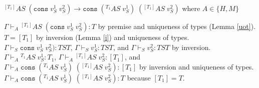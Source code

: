 \begin{case}
$^{[T_{1}]}AS\;(\mathtt{cons}\;v_{S}^{1}\;v_{S}^{2})\rightarrow\mathtt{cons}\;(^{T_{1}}AS\;v_{S}^{1})\;(^{[T_{1}]}AS\;v_{S}^{2})$ where $A\in\lbrace H,M\rbrace$

$\Gamma\vdash_{A}{^{[T_{1}]}A}S\;(\mathtt{cons}\;v_{S}^{1}\;v_{S}^{2}):T$ by premise and uniqueness of types (Lemma \ref{uot}).  $T=[T_{1}]$ by inversion (Lemma \ref{i}) and uniqueness of types.  $\Gamma\vdash_{S}\mathtt{cons}\;v_{S}^{1}\;v_{S}^{2}):TST$, $\Gamma\vdash_{S}v_{S}^{1}:TST$, and $\Gamma\vdash_{S}v_{S}^{2}:TST$ by inversion.  $\Gamma\vdash_{A}{^{T_{1}}A}S\;v_{S}^{1}:T_{1}$, $\Gamma\vdash_{A}{^{[T_{1}]}A}S\;v_{S}^{2}:[T_{1}]$, and $\Gamma\vdash_{A}\mathtt{cons}\;(^{T_{1}}AS\;v_{S}^{1})\;(^{[T_{1}]}AS\;v_{S}^{2}):[T_{1}]$ by inversion and uniqueness of types.  $\Gamma\vdash_{A}\mathtt{cons}\;(^{T_{1}}AS\;v_{S}^{1})\;(^{[T_{1}]}AS\;v_{S}^{2}):T$ because $[T_{1}]=T$.
\end{case}